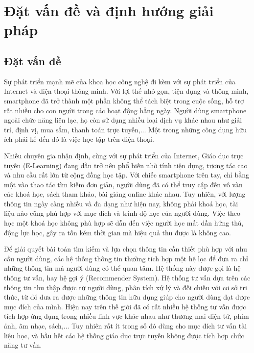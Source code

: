 
\chapter{Đặt vấn đề và định hướng giải pháp} \label{problem-state}
\section{Đặt vấn đề}
Sự phát triển mạnh mẽ của khoa học công nghệ đi kèm với sự phát triển của Internet và điện thoại thông minh. Với lợi thế nhỏ gọn, tiện dụng và thông minh, smartphone đã trở thành một phần không thể tách biệt trong cuộc sống, hỗ trợ rất nhiều cho con người trong các hoạt động hằng ngày. Người dùng smartphone ngoài chức năng liên lạc, họ còn sử dụng nhiều loại dịch vụ khác nhau như giải trí, định vị, mua sắm, thanh toán trực tuyến,... Một trong những công dụng hữu ích phải kể đến đó là việc học tập trên điện thoại.

Nhiều chuyên gia nhận định, cùng với sự phát triển của Internet, Giáo dục trực tuyến (E-Learning) đang dần trở nên phổ biến nhờ tính tiện dụng, tương tác cao và nhu cầu rất lớn từ cộng đồng học tập. Với chiếc smartphone trên tay, chỉ bằng một vào thao tác tìm kiếm đơn giản, người dùng đã có thể truy cập đến vô vàn các khoá học, sách tham khảo, bài giảng online khác nhau. Tuy nhiên, với lượng thông tin ngày càng nhiều và đa dạng như hiện nay, không phải khoá học, tài liệu nào cũng phù hợp với mục đích và trình độ học của người dùng. Việc theo học một khoá học không phù hợp sẽ dẫn đến việc người học mất dần hứng thú, động lực học, gây ra tốn kém thời gian mà hiệu quả thu được là không cao.

Để giải quyết bài toán tìm kiếm và lựa chọn thông tin cần thiết phù hợp với nhu cầu người dùng, các hệ thống thông tin thường tích hợp một hệ lọc để đưa ra chỉ những thông tin mà người dùng có thể quan tâm. Hệ thống này được gọi là hệ thông tư vấn, hay hệ gợi ý (Recommender System). Hệ thống tư vấn dựa trên các thông tin thu thập được từ người dùng, phân tích xử lý và đối chiếu với cơ sở tri thức, từ đó đưa ra được những thông tin hữu dụng giúp cho người dùng đạt được mục đích của mình. Hiện nay trên thế giới đã có rất nhiều hệ thống tư vấn được tích hợp ứng dụng trong nhiều lĩnh vực khác nhau như thương mai điện tử, phim ảnh, âm nhạc, sách,... Tuy nhiên rất ít trong số đó dùng cho mục đích tư vấn tài liệu học, và hầu hết các hệ thống giáo dục trực tuyến không được tích hợp chức năng tư vấn.

